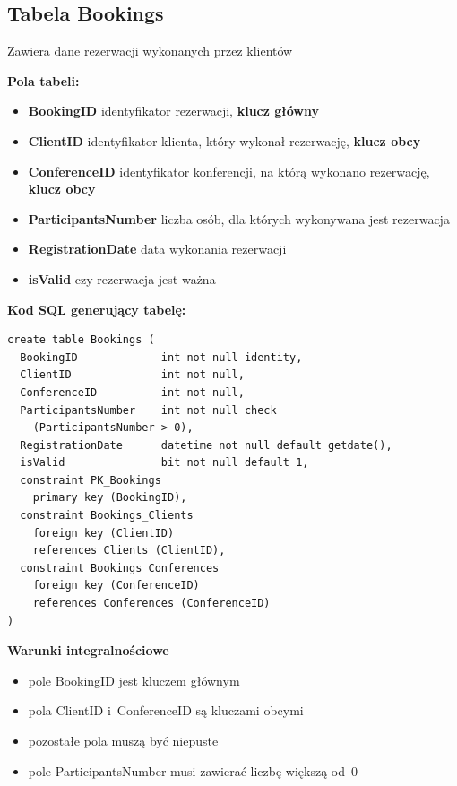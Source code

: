 \documentclass[12pt, a4paper]{mwrep}
\begin{document}
\subsection{Tabela Bookings}

\noindent Zawiera dane rezerwacji wykonanych przez klientów

\vspace{0.5cm}

\noindent \textbf{Pola tabeli:}
\begin{itemize}
  \item \textbf{BookingID} \ppauza identyfikator rezerwacji, \textbf{klucz główny}
  \item \textbf{ClientID} \ppauza identyfikator klienta, który wykonał rezerwację, \textbf{klucz obcy}
  \item \textbf{ConferenceID} \ppauza identyfikator konferencji, na którą wykonano rezerwację, \textbf{klucz obcy}
  \item \textbf{ParticipantsNumber} \ppauza liczba osób, dla których wykonywana jest rezerwacja
  \item \textbf{RegistrationDate} \ppauza data wykonania rezerwacji
  \item \textbf{isValid} \ppauza czy rezerwacja jest ważna
\end{itemize}

\vspace{0.5cm}
\noindent \textbf{Kod SQL generujący tabelę:}

\begin{lstlisting}
create table Bookings (
  BookingID             int not null identity,
  ClientID              int not null,
  ConferenceID          int not null,
  ParticipantsNumber    int not null check
    (ParticipantsNumber > 0),
  RegistrationDate      datetime not null default getdate(),
  isValid               bit not null default 1,
  constraint PK_Bookings 
    primary key (BookingID),
  constraint Bookings_Clients 
    foreign key (ClientID) 
    references Clients (ClientID),
  constraint Bookings_Conferences 
    foreign key (ConferenceID) 
    references Conferences (ConferenceID)
)

\end{lstlisting}

\vspace{0.5cm}
\noindent \textbf{Warunki integralnościowe}
\begin{itemize}
  \item pole BookingID jest kluczem głównym
  \item pola ClientID i~ConferenceID są kluczami obcymi
  \item pozostałe pola muszą być niepuste
  \item pole ParticipantsNumber musi zawierać liczbę większą od~0
\end{itemize}
\end{document}
